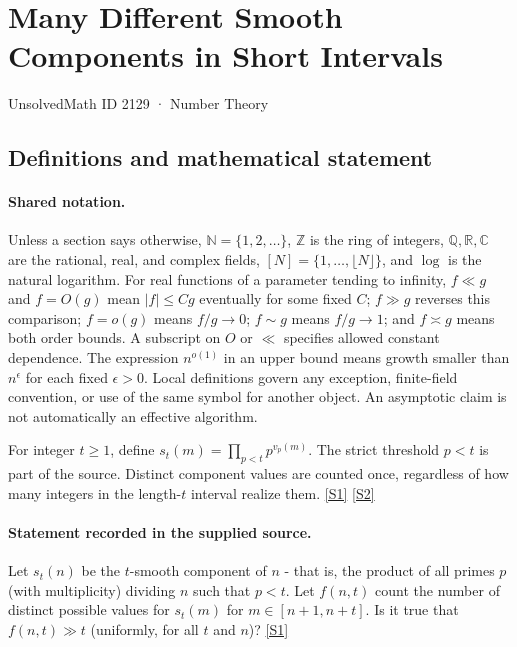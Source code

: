 \documentclass[11pt,a4paper]{article}
\newcommand{\N}{\mathbb{N}}
\newcommand{\Z}{\mathbb{Z}}
\newcommand{\Q}{\mathbb{Q}}
\newcommand{\R}{\mathbb{R}}
\newcommand{\C}{\mathbb{C}}
\newcommand{\sref}[2]{\hyperlink{source:#1:#2}{[S#2]}}
\begin{document}

\setcounter{section}{2128}

\section{Many Different Smooth Components in Short Intervals}\label{2129}

{\small\sffamily UnsolvedMath ID 2129 · Number Theory}

\subsection{Definitions and mathematical statement}

\paragraph{Shared notation.}Unless a section says otherwise, $\N=\{1,2,\ldots\}$,
$\Z$ is the ring of integers, $\Q,\R,\C$ are the rational, real, and complex
fields, $[N]=\{1,\ldots,\lfloor N\rfloor\}$, and $\log$ is the natural
logarithm. For real functions of a parameter tending to infinity,
$f\ll g$ and $f=O(g)$ mean $|f|\leq Cg$ eventually for some fixed $C$;
$f\gg g$ reverses this comparison; $f=o(g)$ means $f/g\to0$;
$f\sim g$ means $f/g\to1$; and $f\asymp g$ means both order bounds.
A subscript on $O$ or $\ll$ specifies allowed constant dependence.
The expression $n^{o(1)}$ in an upper bound means growth smaller than
$n^\epsilon$ for each fixed $\epsilon>0$. Local definitions govern any
exception, finite-field convention, or use of the same symbol for another
object. An asymptotic claim is not automatically an effective algorithm.



For integer $t\geq1$, define $s_t(m)=\prod_{p<t}p^{v_p(m)}$. The strict threshold $p<t$ is part of the source. Distinct component values are counted once, regardless of how many integers in the length-$t$ interval realize them. \sref{2129}{1} \sref{2129}{2}

\paragraph{Statement recorded in the supplied source.}
Let $s_t(n)$ be the $t$-smooth component of $n$ - that is, the product of all primes $p$ (with multiplicity) dividing $n$ such that $p<t$. Let $f(n,t)$ count the number of distinct possible values for $s_t(m)$ for $m\in [n+1,n+t]$. Is it true that $ f(n,t)\gg t $ (uniformly, for all $t$ and $n$)? \sref{2129}{1}
\end{document}
